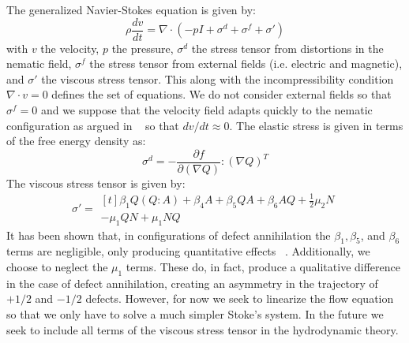 \documentclass[reqno]{article}
\begin{document}
  The generalized Navier-Stokes equation is given by:
  \begin{equation} \label{eq:generalized-navier-stokes}
    \rho \frac{dv}{dt}
    =
    \nabla \cdot \left(
      -p I
      + \sigma^d
      + \sigma^f
      + \sigma'
    \right)
  \end{equation}
  with $v$ the velocity, $p$ the pressure, $\sigma^d$ the stress tensor from
  distortions in the nematic field,
  $\sigma^f$ the stress tensor from external fields (i.e. electric and
  magnetic), and $\sigma'$ the viscous stress tensor.
  This along with the incompressibility condition $\nabla \cdot v = 0$ defines
  the set of equations.
  We do not consider external fields so that $\sigma^f = 0$ and we suppose that
  the velocity field adapts quickly to the nematic configuration as argued in
  ~\cite{svensek_complex_2002} so that $dv/dt \approx 0$.
  The elastic stress is given in terms of the free energy density as:
  \begin{equation}
    \sigma^d
    =
    - \frac{\partial f}{\partial (\nabla Q)} : \left( \nabla Q \right)^T
  \end{equation}
  The viscous stress tensor is given by:
  \begin{equation} \label{eq:viscous-stress-tensor}
    \sigma'
    =
    \begin{multlined}[t]
      \beta_1 Q \left( Q : A \right)
      + \beta_4 A
      + \beta_5 QA
      + \beta_6 AQ
      + \frac12 \mu_2 N \\
      - \mu_1 QN + \mu_1 NQ
    \end{multlined}
  \end{equation}
  It has been shown that, in configurations of defect annihilation the $\beta_1,
  \beta_5$, and $\beta_6$ terms are negligible, only producing quantitative
  effects ~\cite{svensek_hydrodynamics_2002}.
  Additionally, we choose to neglect the $\mu_1$ terms.
  These do, in fact, produce a qualitative difference in the case of defect
  annihilation, creating an asymmetry in the trajectory of $+1/2$ and $-1/2$
  defects.
  However, for now we seek to linearize the flow equation so that we only have
  to solve a much simpler Stoke's system.
  In the future we seek to include all terms of the viscous stress tensor in the
  hydrodynamic theory.
\end{document}
